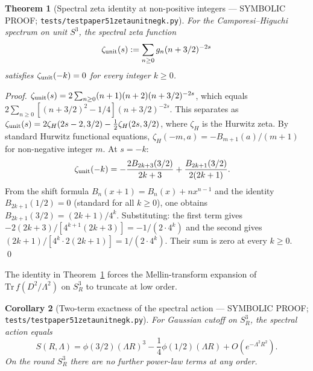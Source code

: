 \documentclass[11pt,a4paper]{article}
\theoremstyle{plain}
\newtheorem{theorem}{Theorem}[section]
\newtheorem{corollary}[theorem]{Corollary}
\theoremstyle{definition}
\newcommand{\sthree}{S^{3}}
\renewcommand{\_}{\textunderscore\allowbreak}
\begin{document}
\begin{theorem}[Spectral zeta identity at non-positive integers ---
SYMBOLIC PROOF; \texttt{tests/test\_paper51\_zeta\_unit\_neg\_k.py}]
\label{thm:zeta_unit_neg_k}
For the Camporesi--Higuchi spectrum on unit $\sthree$, the spectral
zeta function
\begin{equation}
  \zeta_{\rm unit}(s) := \sum_{n \geq 0} g_n (n + 3/2)^{-2s}
\end{equation}
satisfies $\zeta_{\rm unit}(-k) = 0$ for every integer $k \geq 0$.
\end{theorem}

\begin{proof}
$\zeta_{\rm unit}(s) = 2 \sum_{n \geq 0} (n+1)(n+2) (n + 3/2)^{-2s}$,
which equals $2 \sum_{n \geq 0} [(n+3/2)^2 - 1/4] (n + 3/2)^{-2s}$.
This separates as $\zeta_{\rm unit}(s) = 2 \zeta_H(2s - 2, 3/2) -
\frac{1}{2} \zeta_H(2s, 3/2)$, where $\zeta_H$ is the Hurwitz zeta.
By standard Hurwitz functional equations, $\zeta_H(-m, a) =
-B_{m+1}(a)/(m+1)$ for non-negative integer $m$. At $s = -k$:
\begin{align*}
\zeta_{\rm unit}(-k) &= -\frac{2 B_{2k+3}(3/2)}{2k+3}
  + \frac{B_{2k+1}(3/2)}{2(2k+1)}.
\end{align*}
From the shift formula $B_n(x+1) = B_n(x) + nx^{n-1}$ and the
identity $B_{2k+1}(1/2) = 0$ (standard for all $k \geq 0$), one
obtains $B_{2k+1}(3/2) = (2k{+}1)/4^k$. Substituting:
the first term gives $-2(2k{+}3)/[4^{k+1}(2k{+}3)] = -1/(2 \cdot 4^k)$
and the second gives $(2k{+}1)/[4^k \cdot 2(2k{+}1)] = 1/(2 \cdot 4^k)$.
Their sum is zero at every $k \geq 0$. \qed
\end{proof}

The identity in Theorem~\ref{thm:zeta_unit_neg_k} forces the
Mellin-transform expansion of $\mathrm{Tr}\, f(D^2/\Lambda^2)$ on
$\sthree_R$ to truncate at low order.

\begin{corollary}[Two-term exactness of the spectral action ---
SYMBOLIC PROOF; \texttt{tests/test\_paper51\_zeta\_unit\_neg\_k.py}]
\label{cor:two_term}
For Gaussian cutoff on $\sthree_R$, the spectral action equals
\begin{equation}
  S(R, \Lambda) = \phi(3/2) (\Lambda R)^3
                - \frac{1}{4} \phi(1/2) (\Lambda R)
                + O(e^{-\Lambda^2 R^2}).
  \label{eq:two_term_action}
\end{equation}
On the round $\sthree_R$ there are no further power-law terms at any
order.
\end{corollary}
\end{document}
